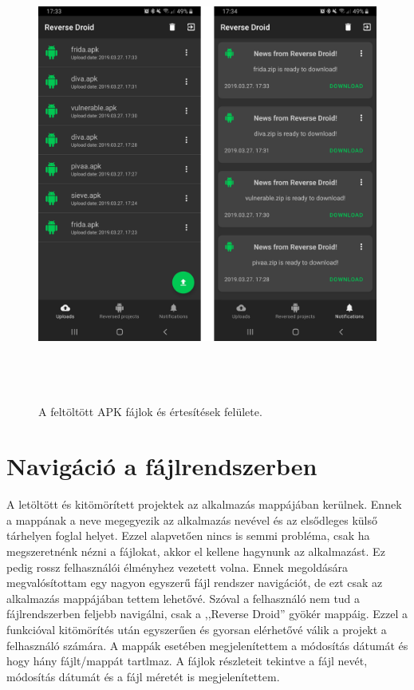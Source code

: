\documentclass{thesis-ekf}
\theoremstyle{definition}
\theoremstyle{remark}
\begin{document}
\begin{figure}[!h]
	\centering
	\includegraphics[height=15cm]{pictures/android_uploads_notifications}
	\caption{A feltöltött APK fájlok és értesítések felülete.}
	\label{uploads_notifications}
\end{figure}

\section{Navigáció a fájlrendszerben}

A letöltött és kitömörített projektek az alkalmazás mappájában kerülnek.
Ennek a mappának a neve megegyezik az alkalmazás nevével és az elsődleges külső tárhelyen foglal helyet.
Ezzel alapvetően nincs is semmi probléma, csak ha megszeretnénk nézni a fájlokat, akkor el kellene hagynunk az alkalmazást.
Ez pedig rossz felhasználói élményhez vezetett volna.
Ennek megoldására megvalósítottam egy nagyon egyszerű fájl rendszer navigációt, de ezt csak az alkalmazás mappájában tettem lehetővé.
Szóval a felhasználó nem tud a fájlrendszerben feljebb navigálni, csak a ,,Reverse Droid'' gyökér mappáig.
Ezzel a funkcióval kitömörítés után egyszerűen és gyorsan elérhetővé válik a projekt a felhasználó számára.
A mappák esetében megjelenítettem a módosítás dátumát és hogy hány fájlt/mappát tartlmaz.
A fájlok részleteit tekintve a fájl nevét, módosítás dátumát és a fájl méretét is megjelenítettem.
\end{document}
